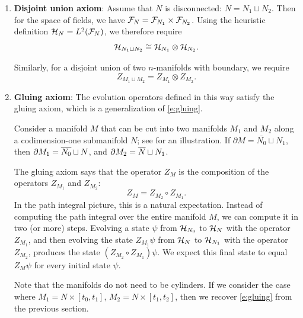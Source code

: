 \begin{enumerate}
  	\item {\bf Disjoint union axiom}: Assume that $N$ is disconnected:
      $N=N_1\sqcup N_2$. Then for the space of fields, we have
      $\mathcal{F}_{N}=\mathcal{F}_{N_1}\times \mathcal{F}_{N_2}$. Using the heuristic definition
      $\mathcal{H}_N=L^2(\mathcal{F}_N)$, we therefore require
    \begin{equation}\label{e:qft_axiom1a}
      \mathcal{H}_{N_1\sqcup N_2} \cong \mathcal{H}_{N_1}\otimes \mathcal{H}_{N_2}.
    \end{equation}
  
    Similarly, for a disjoint union of two $n$-manifolds with boundary, we 
    require
    \begin{equation}\label{e:qft_axiom1b}
      Z_{M_1\sqcup M_2} = Z_{M_1}\otimes Z_{M_2}.
    \end{equation}



  \item {\bf Gluing axiom}: The evolution operators defined in this way satisfy
    the gluing axiom, which is a generalization of \eqref{e:gluing}.

    Consider a manifold $M$ that can be cut into two manifolds $M_1$ and $M_2$
    along a codimension-one submanifold $N$; see  for an
    illustration. If $\partial M = \overline{N_0} \sqcup N_1$, then
    $\partial M_{1} = \overline{N_0} \sqcup N$, and
    $\partial M_{2} = \overline{N} \sqcup N_1$.

    The gluing axiom says that the operator $Z_{M}$ is the composition of the
    operators $Z_{M_1}$ and $Z_{M_2}$:
    \begin{equation}\label{e:gluing-axiom}
    	Z_{M} = Z_{M_2} \circ Z_{M_1}.
    \end{equation}
	In the path integral picture, this is a natural expectation. Instead of
	computing the path integral over the entire manifold $M$, we can compute it
	in two (or more) steps. Evolving a state $\psi$ from $\mathcal{H}_{N_0}$ to
	$\mathcal{H}_{N}$ with the operator $Z_{M_1}$, and then evolving the state
	$Z_{M_1} \psi$ from $\mathcal{H}_{N}$ to $\mathcal{H}_{N_1}$ with the operator
	$Z_{M_2}$, produces the state $(Z_{M_2} \circ Z_{M_1}) \psi$. We expect this
	final state to equal $Z_M \psi$ for every initial state $\psi$.

      Note that the manifolds do not need to be cylinders. If we consider the
      case where $M_1=N\times [t_0,t_1]$, $M_2=N\times [t_1,t_2]$, then we
      recover \eqref{e:gluing} from the previous section.
    \begin{figure}[ht]
    	\centering


\end{figure}
\end{enumerate}

